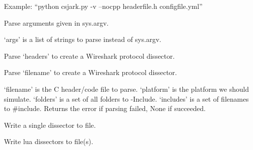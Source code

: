 \documentclass[A4paper,10pt,english]{sphinxmanual}
\begin{document}
Example:
``python csjark.py -v --nocpp headerfile.h configfile.yml''

\begin{fulllineitems}
\label{devel/code:csjark.parse_args}
Parse arguments given in sys.argv.

`args' is a list of strings to parse instead of sys.argv.

\end{fulllineitems}


\begin{fulllineitems}
\label{devel/code:csjark.parse_headers}
Parse `headers' to create a Wireshark protocol dissector.

\end{fulllineitems}


\begin{fulllineitems}
\label{devel/code:csjark.create_dissector}
Parse `filename' to create a Wireshark protocol dissector.

`filename' is the C header/code file to parse.
`platform' is the platform we should simulate.
`folders' is a set of all folders to -Include.
`includes' is a set of filenames to \#include.
Returns the error if parsing failed, None if succeeded.

\end{fulllineitems}


\begin{fulllineitems}
\label{devel/code:csjark._write_dissector}
Write a single dissector to file.

\end{fulllineitems}


\begin{fulllineitems}
\label{devel/code:csjark.write_dissectors_to_file}
Write lua dissectors to file(s).

\end{fulllineitems}
\end{document}
